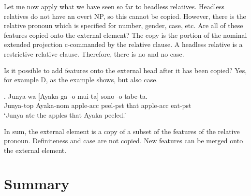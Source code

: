  Let me now apply what we have seen so far to headless relatives. Headless relatives do not have an overt NP, so this cannot be copied. However, there is the relative pronoun which is specified for number, gender, case, etc. Are all of these features copied onto the external element? The copy is the portion of the nominal extended projection c-commanded by the relative clause. A headless relative is a restrictive relative clause. Therefore, there is no  and no case.

 Is it possible to add features onto the external head after it has been copied? Yes, for example D, as the example shows, but also case.

 \exg. Junya-wa [Ayaka-ga -o mui-ta] sono -o tabe-ta.\\
 Junya-\ac{top} Ayaka-\ac{nom} apple-\ac{acc} peel-\ac{pst} that apple-\ac{acc} eat-\ac{pst}\\
 ‘Junya ate the apples that Ayaka peeled.’ 

 In sum, the external element is a copy of a subset of the features of the relative pronoun. Definiteness and case are not copied. New features can be merged onto the external element.


\phantom{x}

\section{Summary}
